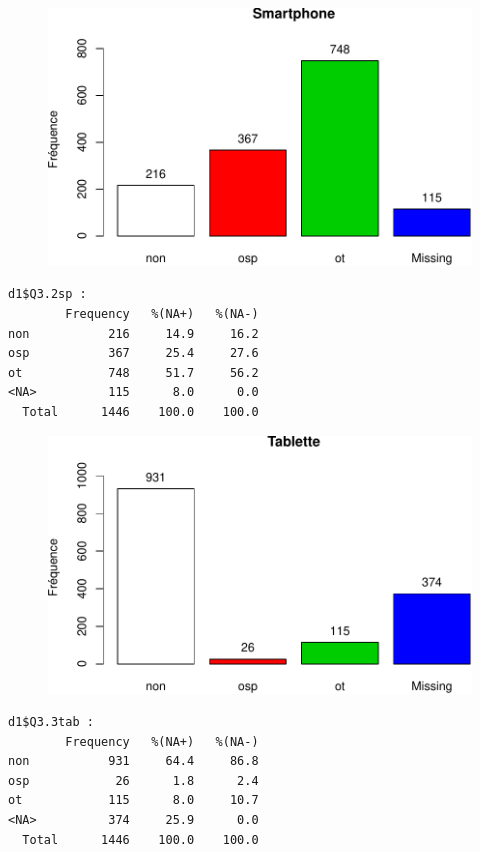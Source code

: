 \documentclass[]{article}
\begin{document}
\begin{figure}[htbp]
\centering
\includegraphics{qs_etudiants_files/figure-latex/outils-2.pdf}
\end{figure}

\begin{verbatim}
d1$Q3.2sp : 
        Frequency   %(NA+)   %(NA-)
non           216     14.9     16.2
osp           367     25.4     27.6
ot            748     51.7     56.2
<NA>          115      8.0      0.0
  Total      1446    100.0    100.0
\end{verbatim}

\begin{figure}[htbp]
\centering
\includegraphics{qs_etudiants_files/figure-latex/outils-3.pdf}
\end{figure}

\begin{verbatim}
d1$Q3.3tab : 
        Frequency   %(NA+)   %(NA-)
non           931     64.4     86.8
osp            26      1.8      2.4
ot            115      8.0     10.7
<NA>          374     25.9      0.0
  Total      1446    100.0    100.0
\end{verbatim}
\end{document}
